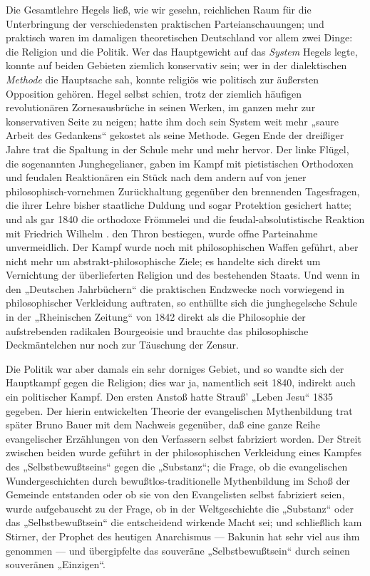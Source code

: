 Die Gesamtlehre Hegels ließ, wie wir gesehn, reichlichen Raum
für die Unterbringung der verschiedensten praktischen
Parteianschauungen; und praktisch waren im damaligen theoretischen
Deutschland vor allem zwei Dinge: die Religion und die Politik. Wer das
Hauptgewicht auf das \emph{System} Hegels legte, konnte auf beiden
Gebieten ziemlich konservativ sein; wer in der
dialektischen \emph{Methode} die Hauptsache sah, konnte religiös wie
politisch zur äußersten Opposition gehören. Hegel selbst schien, trotz
der ziemlich häufigen revolutionären Zornesausbrüche in seinen Werken,
im ganzen mehr zur konservativen Seite zu neigen; hatte ihm doch sein
System weit mehr „saure Arbeit des Gedankens`` gekostet als seine
Methode. Gegen Ende der dreißiger Jahre trat die Spaltung in der Schule
mehr und mehr hervor. Der linke Flügel, die sogenannten Junghegelianer,
gaben im Kampf mit pietistischen Orthodoxen und feudalen Reaktionären
ein Stück nach dem andern auf von jener philosophisch-vornehmen
Zurückhaltung gegenüber den brennenden Tagesfragen, die ihrer Lehre
bisher staatliche Duldung und sogar Protektion gesichert hatte; und als
gar 1840 die orthodoxe Frömmelei und die feudal-absolutistische Reaktion
mit Friedrich Wilhelm . den Thron bestiegen, wurde offne Parteinahme
unvermeidlich. Der Kampf wurde noch mit philosophischen Waffen geführt,
aber nicht mehr um abstrakt-philosophische Ziele; es handelte sich
direkt um Vernichtung der überlieferten Religion und des bestehenden
Staats. Und wenn in den „Deutschen Jahrbüchern`` die praktischen
Endzwecke noch vorwiegend in philosophischer Verkleidung auftraten, so
enthüllte sich die junghegelsche Schule in der „Rheinischen Zeitung`` von
1842 direkt als die Philosophie der aufstrebenden radikalen Bourgeoisie
und brauchte das philosophische Deckmäntelchen nur noch zur Täuschung
der Zensur.

Die Politik war aber damals ein sehr dorniges Gebiet, und so
wandte sich der Hauptkampf gegen die Religion; dies war ja, namentlich
seit 1840, indirekt auch ein politischer Kampf. Den ersten Anstoß hatte
Strauß' „Leben Jesu`` 1835 gegeben. Der hierin entwickelten Theorie der
evangelischen Mythenbildung trat später Bruno Bauer mit dem Nachweis
gegenüber, daß eine ganze Reihe evangelischer Erzählungen von den
Verfassern selbst fabriziert worden. Der Streit zwischen beiden wurde
geführt in der philosophischen Verkleidung eines Kampfes des
„Selbstbewußtseins`` gegen die „Substanz``; die Frage, ob die
evangelischen Wundergeschichten durch bewußtlos-traditionelle
Mythenbildung im Schoß der Gemeinde entstanden oder ob sie von den
Evangelisten selbst fabriziert seien, wurde aufgebauscht zu der Frage,
ob in der Weltgeschichte die „Substanz`` oder das „Selbstbewußtsein`` die
entscheidend wirkende Macht sei; und schließlich kam Stirner, der
Prophet des heutigen Anarchismus --- Bakunin hat sehr viel aus ihm
genommen --- und übergipfelte das souveräne „Selbstbewußtsein`` durch
seinen souveränen „Einzigen``.

